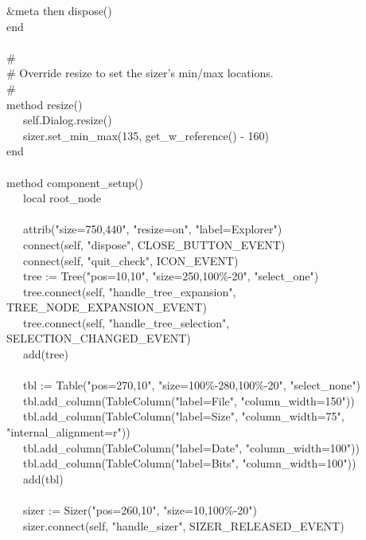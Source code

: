 {\&meta then dispose() \\
\>   end \\
\ \\
\>   \# \\
\>   \# Override resize to set the sizer's min/max
locations. \\
\>   \# \\
\>   method resize() \\
\>   \ \ \ self.Dialog.resize() \\
\>   \ \ \ sizer.set\_min\_max(135, get\_w\_reference() - 160) \\
\>   end \\
\ \\
\>   method component\_setup() \\
\>   \ \ \ local root\_node \\
\ \\
\>   \ \ \ attrib("size=750,440",
"resize=on",
"label=Explorer") \\
\>   \ \ \ connect(self, "dispose",
CLOSE\_BUTTON\_EVENT) \\
\>   \ \ \ connect(self, "quit\_check",
ICON\_EVENT) \\
\>   \ \ \ tree := Tree("pos=10,10",
"size=250,100\%-20",
"select\_one") \\
\>   \ \ \ tree.connect(self,
"handle\_tree\_expansion",
TREE\_NODE\_EXPANSION\_EVENT) \\
\>   \ \ \ tree.connect(self,
"handle\_tree\_selection",
SELECTION\_CHANGED\_EVENT) \\
\>   \ \ \ add(tree) \\
\ \\
\>   \ \ \ tbl := Table("pos=270,10",
"size=100\%-280,100\%-20",
"select\_none") \\
\>   \ \ \ tbl.add\_column(TableColumn("label=File",
"column\_width=150")) \\
\>   \ \ \ tbl.add\_column(TableColumn("label=Size",
"column\_width=75",
"internal\_alignment=r")) \\
\>   \ \ \ tbl.add\_column(TableColumn("label=Date",
"column\_width=100")) \\
\>   \ \ \ tbl.add\_column(TableColumn("label=Bits",
"column\_width=100")) \\
\>   \ \ \ add(tbl) \\
\ \\
\>   \ \ \ sizer := Sizer("pos=260,10",
"size=10,100\%-20") \\
\>   \ \ \ sizer.connect(self,
"handle\_sizer", SIZER\_RELEASED\_EVENT) \\
}

